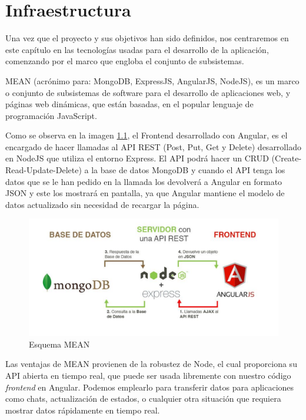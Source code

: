 \chapter{Infraestructura}
Una vez que el proyecto y sus objetivos han sido definidos, nos centraremos en este capítulo en las tecnologías usadas para el desarrollo de la aplicación, comenzando por el marco que engloba el conjunto de subsistemas.

MEAN (acrónimo para: MongoDB, ExpressJS, AngularJS, NodeJS), es un marco o conjunto de subsistemas de software para el desarrollo de aplicaciones web, y páginas web dinámicas, que están basadas, en el popular lenguaje de programación JavaScript.

Como se observa en la imagen \ref{img:EsquemaMean}, el Frontend desarrollado con Angular, es el encargado de hacer llamadas al API REST (Post, Put, Get y Delete) desarrollado en NodeJS que utiliza el entorno Express. El API podrá hacer un CRUD (Create-Read-Update-Delete) a la base de datos MongoDB y cuando el API tenga los datos que se le han pedido en la llamada los devolverá a Angular en formato JSON y este los mostrará en pantalla, ya que Angular mantiene el modelo de datos actualizado sin necesidad de recargar la página.

\begin{figure}[!h]
    \centering
    \includegraphics[width=140mm]{img/infraestructura/scheme.png}
    \caption{Esquema MEAN}
    \label{img:EsquemaMean}
\end{figure}



Las ventajas de MEAN \cite{mean} provienen de la robustez de Node, el cual proporciona su API abierta en tiempo real, que puede ser usada libremente con nuestro código \textit{frontend} en Angular.
Podemos emplearlo para transferir datos para aplicaciones como chats, actualización de estados, o cualquier otra situación que requiera mostrar datos rápidamente en tiempo real.
